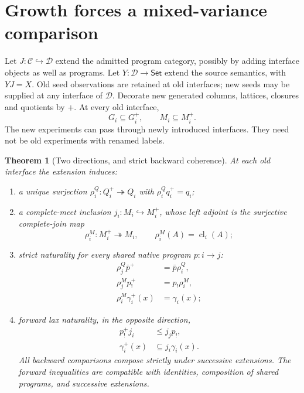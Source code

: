 \documentclass[11pt]{article}
\newtheorem{theorem}{Theorem}[section]
\theoremstyle{remark}\newtheorem{remark}[theorem]{Remark}
\newcommand{\cl}{\operatorname{cl}}
\begin{document}
\section{Growth forces a mixed-variance comparison}
Let $J:\mathcal C\hookrightarrow\mathcal D$ extend the admitted
program category, possibly by adding interface objects as well as
programs. Let $Y:\mathcal D\to\mathsf{Set}$ extend the source semantics,
with $YJ=X$. Old seed observations are retained at old interfaces;
new seeds may be supplied at any interface of $\mathcal D$. Decorate
new generated columns, lattices, closures and quotients by $+$.
At every old interface,
\[
 G_i\subseteq G_i^+,\qquad M_i\subseteq M_i^+.
\]
The new experiments can pass through newly introduced interfaces.
They need not be old experiments with renamed labels.

\begin{theorem}[Two directions, and strict backward coherence]
At each old interface the extension induces:
\begin{enumerate}
\item a unique surjection $\rho_i^Q:Q_i^+\twoheadrightarrow Q_i$
with $\rho_i^Qq_i^+=q_i$;
\item a complete-meet inclusion $j_i:M_i\hookrightarrow M_i^+$,
whose left adjoint is the surjective complete-join map
\[
 \rho_i^M:M_i^+\twoheadrightarrow M_i,
 \qquad \rho_i^M(A)=\cl_i(A);
\]
\item strict naturality for every \emph{shared} native program $p:i\to j$:
\begin{align*}
 \rho_j^Q\bar p^+&=\bar p\rho_i^Q,\\
 \rho_j^M p_!^+&=p_!\rho_i^M,\\
 \rho_i^M\gamma_i^+(x)&=\gamma_i(x);
\end{align*}
\item forward lax naturality, in the opposite direction,
\begin{align*}
 p_!^+j_i&\leq j_jp_!,\\
 \gamma_i^+(x)&\subseteq j_i\gamma_i(x).
\end{align*}
All backward comparisons compose strictly under successive extensions.
The forward inequalities are compatible with identities, composition
of shared programs, and successive extensions.
\end{enumerate}
\end{theorem}
\end{document}
